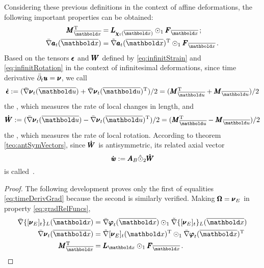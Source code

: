 Considering these previous definitions in the context of affine deformations, the following important properties can be obtained:
\begin{equation}\label{eq:timeDerivGrad}
\begin{aligned}
\tnr{M}_{\overline{\vto{x}}}^\text{T}&= \tnr{L}_{\tnr{\chi}_t(\overline{\vto{x}})}\odot_1\tnr{F}_{\overline{\vto{x}}}\,;\\
\fua{\bar{\nabla}\tnr{a}_t}{\overline{\vto{x}}}&=\fua{\tilde{\nabla}\tnr{a}_t}{\overline{\vto{x}}}^{\text{T}}\odot_1\tnr{F}_{\overline{\vto{x}}}\,.
\end{aligned} 
\end{equation} 
Based on the tensors $\pmb{\epsilon}$ and $\pmb{W}$ defined by \eqref{eq:infinitStrain} and \eqref{eq:infinitRotation} in the context of infinitesimal deformations, since time derivative $\bar{\partial}_t\pmb{\mathit{u}}=\pmb{\nu}$, we call  
\begin{equation}\label{eq:infinitStrain}
\tnr{\dot{\epsilon}}:=(\fua{\bar{\nabla}\tnr{\nu}_t}{\overline{\vto{u}}}+\fua{\bar{\nabla}\tnr{\nu}_t}{\overline{\vto{u}}}^{\text{T}})/2=(\tnr{M}_{\overline{\vto{u}}}^{\text{T}}+\tnr{M}_{\overline{\vto{u}}})/2
\end{equation}
the , which measures the rate of local changes in length,  and
\begin{equation}\label{eq:infinitSpin}
\tnr{\dot{W}}:=(\fua{\bar{\nabla}\tnr{\nu}_t}{\overline{\vto{u}}}-\fua{\bar{\nabla}\tnr{\nu}_t}{\overline{\vto{u}}}^{\text{T}})/2=(\tnr{M}_{\overline{\vto{u}}}^{\text{T}}-\tnr{M}_{\overline{\vto{u}}})/2
\end{equation}
the , which measures the rate of local rotation. According to theorem \ref{teo:antSymVectors}, since $\pmb{\dot{W}}$ is antisymmetric, its related axial vector 
\begin{equation}\label{eq:vectSpin}
\pmb{\dot{\mathit{w}}}:=\pmb{A}_B\hat{\odot}_2 \pmb{\dot{W}}
\end{equation}
is called \,.

{\footnotesize
\begin{proof}
The following development proves only the first of equalities \eqref{eq:timeDerivGrad} because the second is similarly verified. Making $\pmb{\Omega}=\pmb{\nu}_E$ in property \eqref{eq:gradRelFuncs}, 
\begin{align*}
\bar{\nabla}\{[{\tnr{\nu}_E}]_{t}\}_L(\overline{\vto{x}})&=\bar{\nabla}{\tnr{\varphi}}_{t}(\overline{\vto{x}})\odot_1\tilde{\nabla}\{[{\tnr{\nu}_E}]_{t}\}_L(\overline{\vto{x}})\\
\bar{\nabla}{\tnr{\nu}}_{t}(\overline{\vto{x}})&=\tilde{\nabla}[\tnr{\nu}_E]_{t}({\vto{x}})^\text{T}\odot_1\bar{\nabla}{\tnr{\varphi}}_{t}(\overline{\vto{x}})^\text{T}\\
\tnr{M}_{\overline{\vto{x}}}^\text{T}&=\tnr{L}_{{\vto{x}}}\odot_1\tnr{F}_{\overline{\vto{x}}}\,.
\end{align*}
\end{proof}
}


